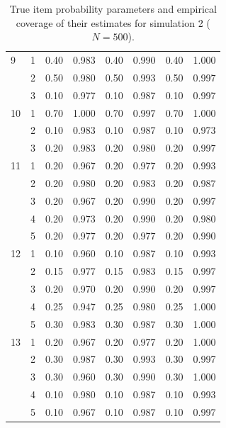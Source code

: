 \begin{table}[H]
\begin{tabular}{llcccccc}
  9 & 1 & 0.40 & 0.983 & 0.40 & 0.990 & 0.40 & 1.000 \\ 
   & 2 & 0.50 & 0.980 & 0.50 & 0.993 & 0.50 & 0.997 \\ 
   & 3 & 0.10 & 0.977 & 0.10 & 0.987 & 0.10 & 0.997 \\ 
  10 & 1 & 0.70 & 1.000 & 0.70 & 0.997 & 0.70 & 1.000 \\ 
   & 2 & 0.10 & 0.983 & 0.10 & 0.987 & 0.10 & 0.973 \\ 
   & 3 & 0.20 & 0.983 & 0.20 & 0.980 & 0.20 & 0.997 \\ 
  11 & 1 & 0.20 & 0.967 & 0.20 & 0.977 & 0.20 & 0.993 \\ 
   & 2 & 0.20 & 0.980 & 0.20 & 0.983 & 0.20 & 0.987 \\ 
   & 3 & 0.20 & 0.967 & 0.20 & 0.990 & 0.20 & 0.997 \\ 
   & 4 & 0.20 & 0.973 & 0.20 & 0.990 & 0.20 & 0.980 \\ 
   & 5 & 0.20 & 0.977 & 0.20 & 0.977 & 0.20 & 0.990 \\ 
  12 & 1 & 0.10 & 0.960 & 0.10 & 0.987 & 0.10 & 0.993 \\ 
   & 2 & 0.15 & 0.977 & 0.15 & 0.983 & 0.15 & 0.997 \\ 
   & 3 & 0.20 & 0.970 & 0.20 & 0.990 & 0.20 & 0.997 \\ 
   & 4 & 0.25 & 0.947 & 0.25 & 0.980 & 0.25 & 1.000 \\ 
   & 5 & 0.30 & 0.983 & 0.30 & 0.987 & 0.30 & 1.000 \\ 
  13 & 1 & 0.20 & 0.967 & 0.20 & 0.977 & 0.20 & 1.000 \\ 
   & 2 & 0.30 & 0.987 & 0.30 & 0.993 & 0.30 & 0.997 \\ 
   & 3 & 0.30 & 0.960 & 0.30 & 0.990 & 0.30 & 1.000 \\ 
   & 4 & 0.10 & 0.980 & 0.10 & 0.987 & 0.10 & 0.993 \\ 
   & 5 & 0.10 & 0.967 & 0.10 & 0.987 & 0.10 & 0.997 \\ 
   \bottomrule
\end{tabular}
\caption{True item probability parameters and empirical coverage of their estimates for simulation 2 ($N = 500$).} 
\label{table:sim2_item_prob_coverage_N500}
\end{table}
